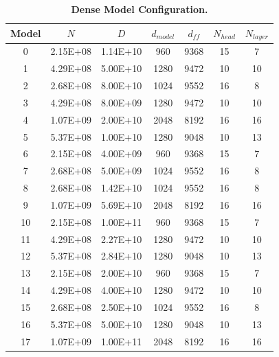 \documentclass[11pt]{article}
\begin{document}
\begin{table}[h!]
    \centering
    \begin{tabular}{ccccccc}
        \toprule Model & {$N$} & {$D$} & $d_{{model}}$ & $d_{{ff}}$ & $N_{{head}}$ & $N_{{layer}}$ \\
        \midrule 
        0 & 2.15E+08 & 1.14E+10 & 960 & 9368 & 15 & 7 \\
        1 & 4.29E+08 & 5.00E+10 & 1280 & 9472 & 10 & 10 \\
        2 & 2.68E+08 & 8.00E+10 & 1024 & 9552 & 16 & 8 \\
        3 & 4.29E+08 & 8.00E+09 & 1280 & 9472 & 10 & 10 \\
        4 & 1.07E+09 & 2.00E+10 & 2048 & 8192 & 16 & 16 \\
        5 & 5.37E+08 & 1.00E+10 & 1280 & 9048 & 10 & 13 \\
        6 & 2.15E+08 & 4.00E+09 & 960 & 9368 & 15 & 7 \\
        7 & 2.68E+08 & 5.00E+09 & 1024 & 9552 & 16 & 8 \\
        8 & 2.68E+08 & 1.42E+10 & 1024 & 9552 & 16 & 8 \\
        9 & 1.07E+09 & 5.69E+10 & 2048 & 8192 & 16 & 16 \\
        10 & 2.15E+08 & 1.00E+11 & 960 & 9368 & 15 & 7 \\
        11 & 4.29E+08 & 2.27E+10 & 1280 & 9472 & 10 & 10 \\
        12 & 5.37E+08 & 2.84E+10 & 1280 & 9048 & 10 & 13 \\
        13 & 2.15E+08 & 2.00E+10 & 960 & 9368 & 15 & 7 \\
        14 & 4.29E+08 & 4.00E+10 & 1280 & 9472 & 10 & 10 \\
        15 & 2.68E+08 & 2.50E+10 & 1024 & 9552 & 16 & 8 \\
        16 & 5.37E+08 & 5.00E+10 & 1280 & 9048 & 10 & 13 \\
        17 & 1.07E+09 & 1.00E+11 & 2048 & 8192 & 16 & 16 \\
        \bottomrule
    \end{tabular}
    \caption{\textbf{Dense Model Configuration.}} %
    \label{tab:struct}
\end{table}
\end{document}
